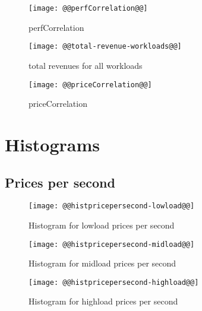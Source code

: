 \documentclass[11pt]{article}
\begin{document}
\begin{figure}[htbp]
  \begin{center}
    \texttt{[image: @@perfCorrelation@@]}
    \caption{perfCorrelation}
    \label{fig:perfCorrelation}
  \end{center}
\end{figure}

\begin{figure}[htbp]
  \begin{center}
    \texttt{[image: @@total-revenue-workloads@@]}
    \caption{total revenues for all workloads}
    \label{fig:priceCorrelation}
  \end{center}
\end{figure}

\begin{figure}[htbp]
  \begin{center}
    \texttt{[image: @@priceCorrelation@@]}
    \caption{priceCorrelation}
    \label{fig:priceCorrelation}
  \end{center}
\end{figure}


\newpage
\section{Histograms}

\subsection{Prices per second}
\begin{figure}[htbp]
  \begin{center}
    \texttt{[image: @@histpricepersecond-lowload@@]}
    \caption{Histogram for lowload prices per second}
    \label{fig:histpricepersecond-lowload}
  \end{center}
\end{figure}
\begin{figure}[htbp]
  \begin{center}
    \texttt{[image: @@histpricepersecond-midload@@]}
    \caption{Histogram for midload prices per second}
    \label{fig:histpricepersecond-midload}
  \end{center}
\end{figure}
\begin{figure}[htbp]
  \begin{center}
    \texttt{[image: @@histpricepersecond-highload@@]}
    \caption{Histogram for highload prices per second}
    \label{fig:histpricepersecond-highload}
  \end{center}
\end{figure}
\end{document}
